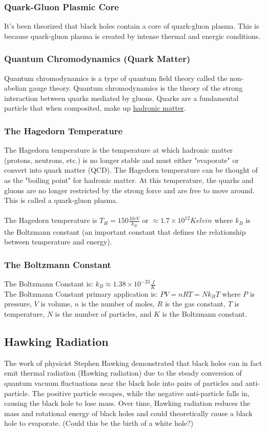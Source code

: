 \documentclass{article}
\begin{document}
\subsubsection{Quark-Gluon Plasmic Core}
It's been theorized that black holes contain a core of quark-gluon plasma. This is because quark-gluon plasma is created by intense thermal and energic conditions.

\subsubsection{Quantum Chromodynamics (Quark Matter)}
Quantum chromodynamics is a type of quantum field theory called the non-abelian gauge theory. Quantum chromodynamics is the theory of the strong interaction between quarks mediated by gluons. Quarks are a fundamental particle that when composited, make up \hyperref[sec:hadronicmatter]{hadronic matter}.

\subsubsection{The Hagedorn Temperature}\label{sec:hagedorntemperature}
The Hagedorn temperature is the temperature at which hadronic matter (protons, neutrons, etc.) is no longer stable and must either "evaporate" or convert into quark matter (QCD). The Hagedorn temperature can be thought of as the "boiling point" for hadronic matter. At this temperature, the quarks and gluons are no longer restricted by the strong force and are free to move around. This is called a quark-gluon plasma.\\\\
The Hagedorn temperature is $T_H = 150 \frac{MeV}{k_B}$ or $\approx 1.7\times 10^{12} Kelvin$ where $k_B$ is the Boltzmann constant (an important constant that defines the relationship between temperature and energy).

\subsubsection{The Boltzmann Constant}
The Boltzmann Constant is: $k_B \approx 1.38 \times 10^{-23}\frac{J}{K}$ \\
The Boltzmann Constant primary application is: $PV = nRT = Nk_B T$ where $P$ is pressure, $V$ is volume, $n$ is the number of moles, $R$ is the gas constant, $T$ is temperature, $N$ is the number of particles, and $K$ is the Boltzmann constant.

\subsection{Hawking Radiation}
The work of physicist Stephen Hawking demonstrated that black holes can in fact emit thermal radiation (Hawking radiation) due to the steady conversion of quantum vacuum fluctuations near the black hole into pairs of particles and anti-particle. The positive particle escapes, while the negative anti-particle falls in, causing the black hole to lose mass. Over time, Hawking radiation reduces the mass and rotational energy of black holes and could theoretically cause a black hole to evaporate. (Could this be the birth of a white hole?)
\end{document}
